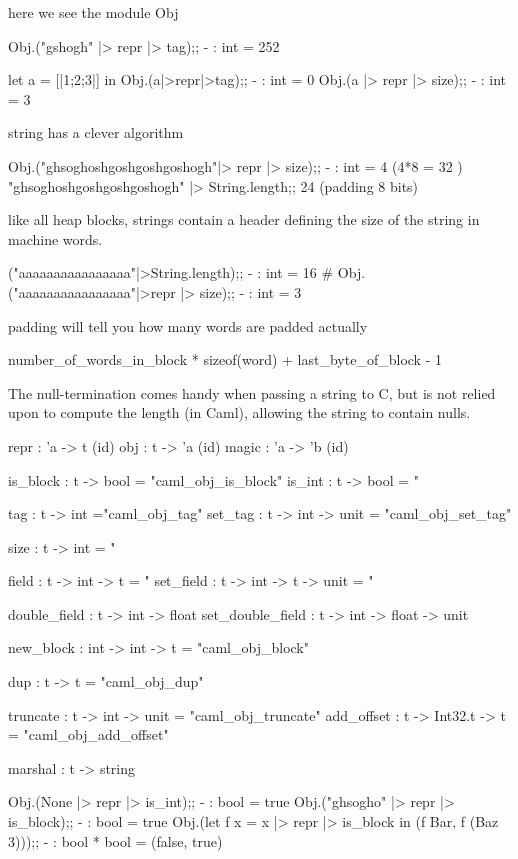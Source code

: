 \begin{enumerate}
 here we see the module  Obj
\begin{alternate}
Obj.("gshogh" |> repr |> tag);;
- : int = 252
\end{alternate}

\begin{alternate}
let a = [|1;2;3|] in Obj.(a|>repr|>tag);;
- : int = 0
Obj.(a |> repr |> size);;
- : int = 3
\end{alternate}

string has a clever algorithm
\begin{alternate}
Obj.("ghsoghoshgoshgoshgoshogh"|> repr |> size);;
- : int = 4 (4*8 = 32 )
"ghsoghoshgoshgoshgoshogh" |> String.length;;
24 (padding 8 bits)
\end{alternate}

like all heap blocks, strings contain a header defining
the size of the string in  machine words.

\begin{alternate}
("aaaaaaaaaaaaaaaa"|>String.length);;
- : int = 16
# Obj.("aaaaaaaaaaaaaaaa"|>repr |> size);;
- : int = 3
\end{alternate}
padding will tell you how many words are padded actually

\begin{bluetext}
number_of_words_in_block * sizeof(word) + last_byte_of_block - 1
\end{bluetext}

The null-termination comes handy when passing a string to C, but is
not relied upon to compute the length (in Caml), allowing the string
to contain nulls.


  

\begin{bluetext}
repr : 'a -> t (id)
obj : t -> 'a (id)
magic : 'a -> 'b (id)

is_block : t -> bool = "caml_obj_is_block"
is_int : t -> bool = "%

tag : t -> int ="caml_obj_tag" %
set_tag : t -> int -> unit = "caml_obj_set_tag"

size : t -> int = "%

field : t -> int -> t = "%
set_field : t -> int -> t -> unit = "%

double_field : t -> int -> float
set_double_field : t -> int -> float -> unit

new_block : int -> int -> t = "caml_obj_block"

dup : t -> t = "caml_obj_dup"

truncate : t -> int -> unit = "caml_obj_truncate"
add_offset : t -> Int32.t -> t = "caml_obj_add_offset"

marshal : t -> string 
\end{bluetext}


\begin{alternate}
Obj.(None |> repr |> is_int);;
- : bool = true
Obj.("ghsogho" |> repr |> is_block);;
- : bool = true
Obj.(let f x = x |> repr |> is_block in (f Bar, f (Baz 3)));;
- : bool * bool = (false, true)
\end{alternate}

\end{enumerate}

